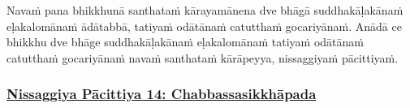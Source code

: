 Navaṁ pana\makeatletter\hyperlink{endnote179a-appendix}\makeatother{} bhikkhunā santhataṁ\makeatletter\hyperlink{endnote179-appendix}\makeatother{} kārayamānena dve bhāgā suddhakāḷakānaṁ eḷakalomānaṁ ādātabbā, tatiyaṁ odātānaṁ catutthaṁ gocariyānaṁ. Anādā ce bhikkhu dve bhāge suddhakāḷakānaṁ eḷakalomānaṁ tatiyaṁ odātānaṁ catutthaṁ gocariyānaṁ navaṁ santhataṁ\makeatletter\hyperlink{endnote180-appendix}\makeatother{} kārāpeyya, nissaggiyaṁ pācittiyaṁ.



\subsubsection*{\hyperref[forf-exp14]{Nissaggiya Pācittiya 14: Chabbassasikkhāpada}}
\label{np14}

